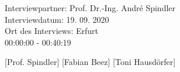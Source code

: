 \documentclass[a4paper, 12pt]{scrartcl}
\newlength{\transcriptlen}
\begin{document}
\newpage














Interviewpartner: \hfill Prof. Dr.-Ing. André Spindler\\
Interviewdatum: \hfill 19. 09. 2020\\
Ort des Interviews: \hfill Erfurt\\
\vspace{0.4cm}
00:00:00 - 00:40:19\\
\vspace{0.4cm}

\footnotesize
{}[Prof. Spindler]
[Fabian Beez]
[Toni Hausdörfer]
\addtolength{\transcriptlen}{1em}
\end{document}
